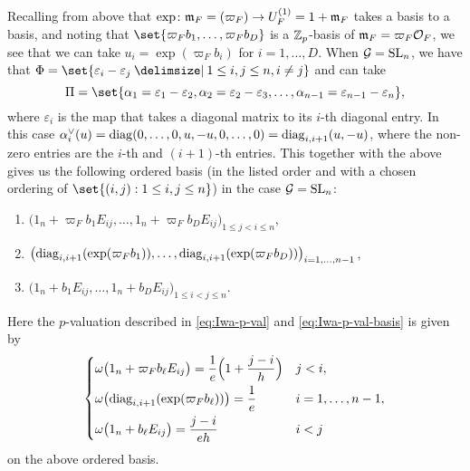 Recalling from above that $\exp \colon \mathfrak{m}_{F} = (\varpi_{F}) \to U_{F}^{(1)} = 1 + \mathfrak{m}_{F}$ takes a basis to a basis, and noting that $\set{ \varpi_{F}b_{1}, \dotsc, \varpi_{F}b_{D} }$ is a $\mathbb{Z}_{p}$-basis of $\mathfrak{m}_{F} = \varpi_{F}\mathcal{O}_{F}$, we see that we can take $u_{i} = \exp(\varpi_{F}b_{i})$ for $i=1,\dotsc,D$. When $\mathcal{G} = \operatorname{SL}_{n}$, we have that $\Phi = \set{ \varepsilon_{i}-\varepsilon_{j} \given 1 \leq i,j \leq n, i\neq j }$ and can take
\begin{equation*}
  \Pi = \set{\alpha_{1}=\varepsilon_{1}-\varepsilon_{2}, \alpha_{2}=\varepsilon_{2}-\varepsilon_{3}, \dotsc, \alpha_{n-1}=\varepsilon_{n-1}-\varepsilon_{n}},
\end{equation*}
where $\varepsilon_{i}$ is the map that takes a diagonal matrix to its $i$-th diagonal entry. In this case $\alpha_{i}^{\vee}(u) = \operatorname{diag}(0,\dotsc,0,u,-u,0,\dotsc,0) = \operatorname{diag}_{i,i+1}(u,-u)$, where the non-zero entries are the $i$-th and $(i+1)$-th entries. This together with the above gives us the following ordered basis (in the listed order and with a chosen ordering of $\set{ (i,j) : 1 \leq i,j \leq n }$) in the case $\mathcal{G} = \operatorname{SL}_{n}$:
\begin{enumerate}[$\bullet$]
  \item $\bigl( 1_{n}+\varpi_{F}b_{1}E_{ij}, \dotsc, 1_{n}+\varpi_{F}b_{D}E_{ij} \bigr)_{1 \leq j < i \leq n}$,
  \item $\bigl( \operatorname{diag}_{i,i+1}(\exp(\varpi_{F}b_{1})), \dotsc, \operatorname{diag}_{i,i+1}(\exp(\varpi_{F}b_{D})) \bigr)_{i=1,\dotsc,n-1}$,
  \item $\bigl( 1_{n}+b_{1}E_{ij}, \dotsc, 1_{n}+b_{D}E_{ij} \bigr)_{1 \leq i < j \leq n}$.
\end{enumerate}
Here the $p$-valuation described in \eqref{eq:Iwa-p-val} and \eqref{eq:Iwa-p-val-basis} is given by
\begin{equation}\label{eq:Iwa-p-val-basis-SLn}
  \begin{dcases}
    \omega\bigl( 1_{n} + \varpi_{F}b_{\ell}E_{ij} \bigr) = \frac{1}{e}\Bigl( 1 + \frac{j-i}{h} \Bigr) & j < i, \\
    \omega\bigl( \operatorname{diag}_{i,i+1}(\exp(\varpi_{F}b_{\ell})) \bigr) = \frac{1}{e} & i = 1,\dotsc,n-1, \\
    \omega\bigl( 1_{n}+b_{\ell}E_{ij} \bigr) = \frac{j-i}{eh} & i < j
  \end{dcases}
\end{equation}
on the above ordered basis.


